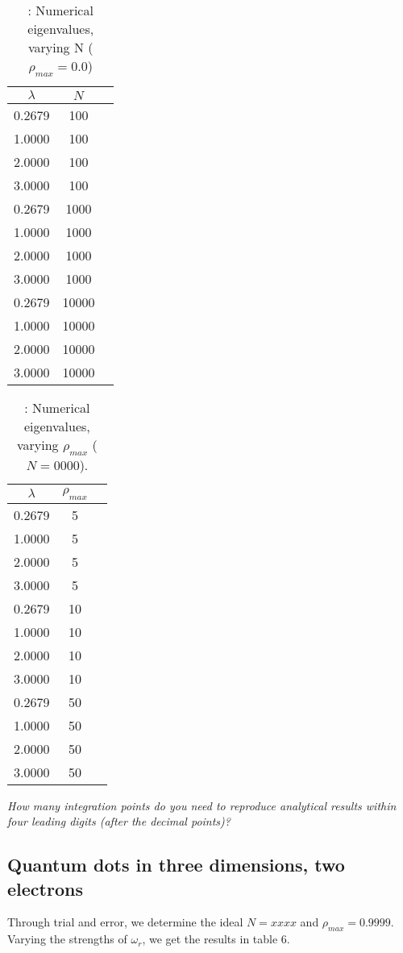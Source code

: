 \documentclass{article}
\begin{document}
		\begin{table}[h!]
			\caption{: Numerical eigenvalues, varying N ($\rho_{max} = 0.0$)}
			\begin{tabular}{c c c}
				$\lambda$ & $N$ \\
				\hline
				0.2679 & 100 \\
				1.0000 & 100 \\
				2.0000 & 100 \\
				3.0000 & 100 \\
				0.2679 & 1000 \\
				1.0000 & 1000 \\
				2.0000 & 1000 \\
				3.0000 & 1000 \\
				0.2679 & 10000 \\
				1.0000 & 10000 \\
				2.0000 & 10000 \\
				3.0000 & 10000 \\
			\end{tabular}
		\end{table}
		\begin{table}[h!]
			\caption{: Numerical eigenvalues, varying $\rho_{max}$ ($N = 0000$).}
			\begin{tabular}{c c c}
				$\lambda$ & $\rho_{max}$\\
				\hline
				0.2679 & 5 \\
				1.0000 & 5 \\
				2.0000 & 5 \\
				3.0000 & 5 \\
				0.2679 & 10 \\
				1.0000 & 10 \\
				2.0000 & 10 \\
				3.0000 & 10 \\
				0.2679 & 50 \\
				1.0000 & 50 \\
				2.0000 & 50 \\
				3.0000 & 50 \\
			\end{tabular}
		\end{table}
		
		\textit{How many integration points do you need to reproduce analytical results
		within four leading digits (after the decimal points)?}

	\subsection{Quantum dots in three dimensions, two electrons}
		Through trial and error, we determine the ideal $N = xxxx$ and $\rho_{max} = 0.9999$.
		Varying the strengths of $\omega_r$, we get the results in table 6.
		
\end{document}
